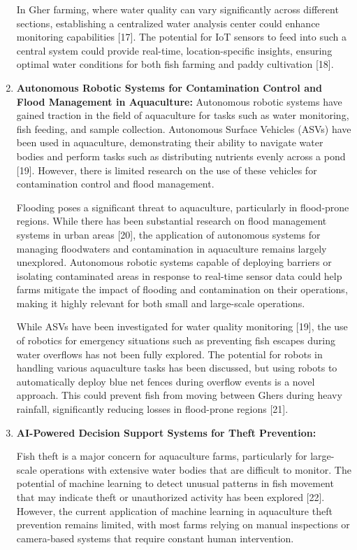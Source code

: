 \documentclass[conference]{IEEEtran}
\begin{document}
\begin{enumerate}
In Gher farming, where water quality can vary significantly across different sections, establishing a centralized water analysis center could enhance monitoring capabilities [17]. The potential for IoT sensors to feed into such a central system could provide real-time, location-specific insights, ensuring optimal water conditions for both fish farming and paddy cultivation [18].

	\item \textbf{Autonomous Robotic Systems for Contamination Control and Flood Management in Aquaculture: }
	Autonomous robotic systems have gained traction in the field of aquaculture for tasks such as water monitoring, fish feeding, and sample collection. Autonomous Surface Vehicles (ASVs) have been used in aquaculture, demonstrating their ability to navigate water bodies and perform tasks such as distributing nutrients evenly across a pond [19]. However, there is limited research on the use of these vehicles for contamination control and flood management.

Flooding poses a significant threat to aquaculture, particularly in flood-prone regions. While there has been substantial research on flood management systems in urban areas [20], the application of autonomous systems for managing floodwaters and contamination in aquaculture remains largely unexplored. Autonomous robotic systems capable of deploying barriers or isolating contaminated areas in response to real-time sensor data could help farms mitigate the impact of flooding and contamination on their operations, making it highly relevant for both small and large-scale operations.

While ASVs have been investigated for water quality monitoring [19], the use of robotics for emergency situations such as preventing fish escapes during water overflows has not been fully explored. The potential for robots in handling various aquaculture tasks has been discussed, but using robots to automatically deploy blue net fences during overflow events is a novel approach. This could prevent fish from moving between Ghers during heavy rainfall, significantly reducing losses in flood-prone regions [21].

\item \textbf{AI-Powered Decision Support Systems for Theft Prevention: }

Fish theft is a major concern for aquaculture farms, particularly for large-scale operations with extensive water bodies that are difficult to monitor. The potential of machine learning to detect unusual patterns in fish movement that may indicate theft or unauthorized activity has been explored [22]. However, the current application of machine learning in aquaculture theft prevention remains limited, with most farms relying on manual inspections or camera-based systems that require constant human intervention.


\end{enumerate}
\end{document}
